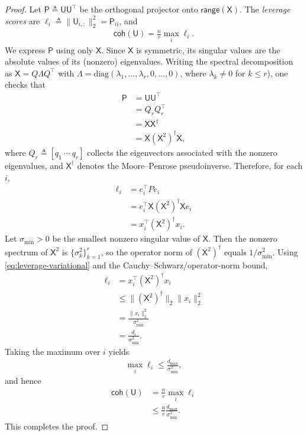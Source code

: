 \documentclass[12pt]{article}
\newcommand{\s}[1]{\mathsf{#1}}
\begin{document}
\begin{proof}
Let $\s{P}\triangleq\s{U}\s{U}^\top$ be the orthogonal projector onto $\s{range}(\s{X})$.
The \emph{leverage scores} are $\ell_i\triangleq\|\s{U}_{i,:}\|_2^2=\s{P}_{ii}$, and
\begin{align}
\s{coh}(\s{U})=\frac{n}{r}\max_i \ell_i.
\end{align}
We express $\s{P}$ using only $\s{X}$. Since $\s{X}$ is symmetric, its singular values are the absolute values
of its (nonzero) eigenvalues. Writing the spectral decomposition as $\s{X}=Q\Lambda Q^\top$ with
$\Lambda=\mathrm{diag}(\lambda_1,\dots,\lambda_r,0,\dots,0)$, where $\lambda_k\neq 0$ for $k\leq r$),
one checks that
\begin{align}
\s{P}&=\s{U}\s{U}^\top \\
&= Q_r Q_r^\top \\
&= \s{X} \s{X}^\dagger\\
&= \s{X}(\s{X}^2)^\dagger \s{X},
\end{align}
where $Q_r\triangleq[q_1\ \cdots\ q_r]$ collects the eigenvectors associated with the nonzero eigenvalues,
and $\s{X}^\dagger$ denotes the Moore--Penrose pseudoinverse. Therefore, for each $i$,
\begin{align}\label{eq:leverage-variational}
\ell_i &= e_i^\top P e_i \\
&= e_i^\top \s{X} (\s{X}^2)^\dagger \s{X} e_i\\
&= x_i^\top (\s{X}^2)^\dagger x_i.
\end{align}
Let $\sigma_{\min}>0$ be the smallest nonzero singular value of $\s{X}$. Then the nonzero spectrum of $\s{X}^2$ is $\{\sigma_k^2\}_{k=1}^r$, so the operator norm of $(\s{X}^2)^\dagger$ equals $1/\sigma_{\min}^2$. Using \eqref{eq:leverage-variational} and the Cauchy--Schwarz/operator-norm bound,
\begin{align}
\ell_i &=x_i^\top (\s{X}^2)^\dagger x_i\\
&\leq \|(\s{X}^2)^\dagger\|_2\|x_i\|_2^2\\
&= \frac{\|x_i\|_2^2}{\sigma_{\min}^2}\\
&= \frac{d_i}{\sigma_{\min}^2}.
\end{align}
Taking the maximum over $i$ yields
\begin{align}
\max_i \ell_i\leq\frac{d_{\max}}{\sigma_{\min}^2},
\end{align}
and hence
\begin{align}
\s{coh}(\s{U})&=\frac{n}{r}\max_i \ell_i \\
&\leq \frac{n}{r}\frac{d_{\max}}{\sigma_{\min}^2}.
\end{align}
This completes the proof.
\end{proof}
\end{document}
